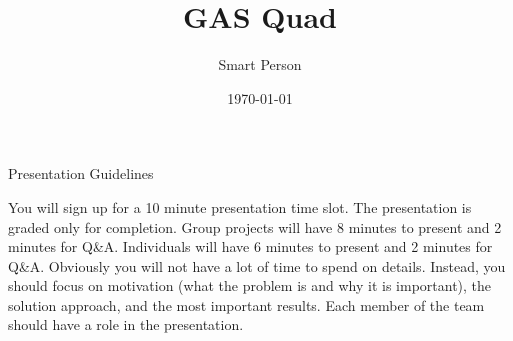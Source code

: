 \documentclass{beamer}
\title[Short Title]{GAS Quad}
\author{Smart Person}
\institute[MAGICC Lab]{\texttt{[image: logo\_gray]}}
\date{\today}
\begin{document}
\begin{frame}
\titlepage
\end{frame}

\begin{frame}{Presentation Guidelines}

You will sign up for a 10 minute presentation time slot. The presentation is graded only for completion. Group projects will have 8 minutes to present and 2 minutes for Q\&A. Individuals will have 6 minutes to present and 2 minutes for Q\&A. Obviously you will not have a lot of time to spend on details. Instead, you should focus on motivation (what the problem is and why it is important), the solution approach, and the most important results. Each member of the team should have a role in the presentation.

\end{frame}
\end{document}
